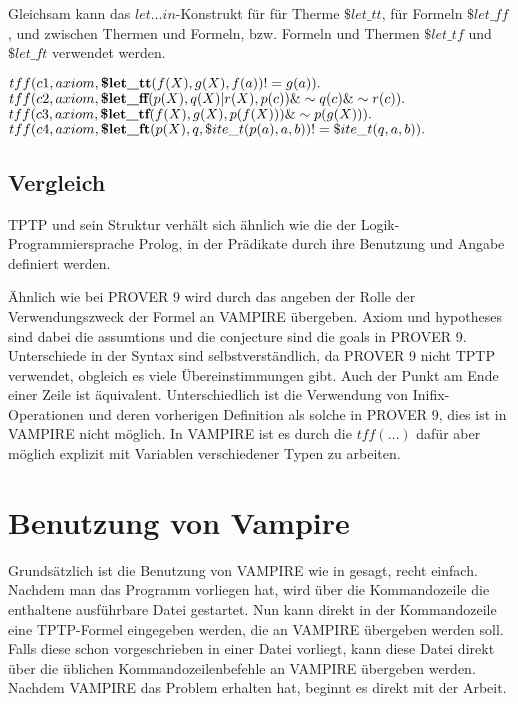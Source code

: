 \documentclass{article}
\begin{document}
Gleichsam kann das $let\dots in$-Konstrukt für für Therme $\$let\_tt$, für Formeln $\$let\_ff$, und zwischen Thermen und Formeln, bzw. Formeln und Thermen $\$let\_tf$ und $\$let\_ft$ verwendet werden.

$tff(c1,axiom,\\
\textbf{\$let\_tt}(f(X),g(X),f(a))!=g(a)).$\\

$tff(c2,axiom,\\
\textbf{\$let\_ff}(p(X),q(X)|r(X),p(c)) \& \sim q(c)\& \sim r(c)).$\\

$tff(c3,axiom,\\
\textbf{\$let\_tf}(f(X),g(X),p(f(X)))\& \sim p(g(X))).$\\

$tff(c4,axiom,\\
\textbf{\$let\_ft}(p(X),q,\$ite\_t(p(a),a,b))!=\$ite\_t(q,a,b)).$\\

\subsection{Vergleich}
\label{subsec:tptpcomp}
TPTP und sein Struktur verhält sich ähnlich wie die der Logik-Programmiersprache Prolog, in der Prädikate durch ihre Benutzung und Angabe definiert werden.

Ähnlich wie bei PROVER 9 wird durch das angeben der Rolle der Verwendungszweck der Formel an VAMPIRE übergeben. Axiom und hypotheses sind dabei die assumtions und die conjecture sind die goals in PROVER 9.
Unterschiede in der Syntax sind selbstverständlich, da PROVER 9 nicht TPTP verwendet, obgleich es viele Übereinstimmungen gibt.
Auch der Punkt am Ende einer Zeile ist äquivalent. Unterschiedlich ist die Verwendung von Inifix-Operationen und deren vorherigen Definition als solche in PROVER 9, 
dies ist in VAMPIRE nicht möglich. In VAMPIRE ist es durch die $tff(\dots)$ dafür aber möglich explizit mit Variablen verschiedener Typen zu arbeiten.\cite{cav2013, prover9manual} 


\section{Benutzung von Vampire}
\label{sec:invocation}

Grundsätzlich ist die Benutzung von VAMPIRE wie in \cite{cav2013} gesagt, recht einfach. Nachdem man das Programm vorliegen hat, wird über die Kommandozeile die enthaltene ausführbare Datei gestartet. Nun kann direkt in der Kommandozeile eine TPTP-Formel eingegeben werden, die an VAMPIRE übergeben werden soll. Falls diese schon vorgeschrieben in einer Datei vorliegt, kann diese Datei direkt über die üblichen Kommandozeilenbefehle an VAMPIRE übergeben werden. Nachdem VAMPIRE das Problem erhalten hat, beginnt es direkt mit der Arbeit.
\end{document}

